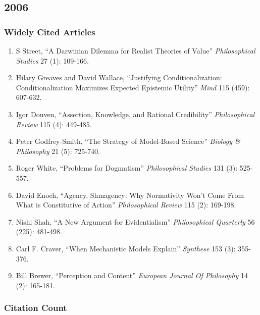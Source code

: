 \documentclass[
  10pt,
  letterpaper,
  DIV=11,
  numbers=noendperiod,
  twoside]{scrartcl}
\providecommand{\tightlist}{%
  \setlength{\itemsep}{0pt}\setlength{\parskip}{0pt}}\usepackage{longtable,booktabs,array}
\begin{document}
\newpage

\subsection{2006}\label{section-30}

\subsubsection*{Widely Cited Articles}\label{widely-cited-articles-30}

\begin{enumerate}
\def\labelenumi{\arabic{enumi}.}
\tightlist
\item
  S Street, ``A Darwinian Dilemma for Realist Theories of Value''
  \emph{Philosophical Studies} 27 (1): 109-166.
\item
  Hilary Greaves and David Wallace, ``Justifying Conditionalization:
  Conditionalization Maximizes Expected Epistemic Utility'' \emph{Mind}
  115 (459): 607-632.
\item
  Igor Douven, ``Assertion, Knowledge, and Rational Credibility''
  \emph{Philosophical Review} 115 (4): 449-485.
\item
  Peter Godfrey-Smith, ``The Strategy of Model-Based Science''
  \emph{Biology \& Philosophy} 21 (5): 725-740.
\item
  Roger White, ``Problems for Dogmatism'' \emph{Philosophical Studies}
  131 (3): 525-557.
\item
  David Enoch, ``Agency, Shmagency: Why Normativity Won't Come From What
  is Constitutive of Action'' \emph{Philosophical Review} 115 (2):
  169-198.
\item
  Nishi Shah, ``A New Argument for Evidentialism'' \emph{Philosophical
  Quarterly} 56 (225): 481-498.
\item
  Carl F. Craver, ``When Mechanistic Models Explain'' \emph{Synthese}
  153 (3): 355-376.
\item
  Bill Brewer, ``Perception and Content'' \emph{European Journal Of
  Philosophy} 14 (2): 165-181.
\end{enumerate}

\subsubsection*{Citation Count}\label{citation-count-30}
\end{document}

